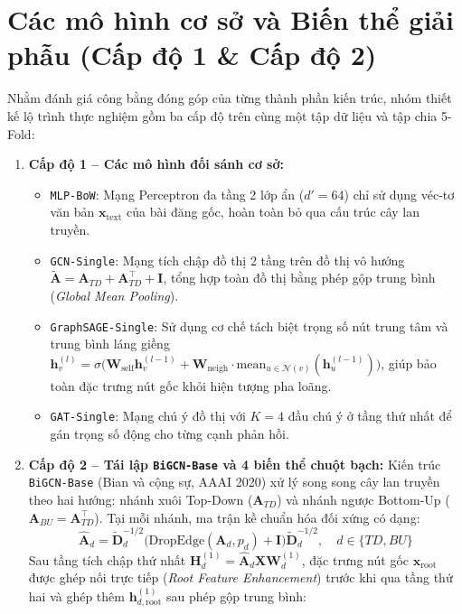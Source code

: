 \documentclass[11pt,a4paper]{extreport}
\begin{document}
\section{Các mô hình cơ sở và Biến thể giải phẫu (Cấp độ 1 \& Cấp độ 2)}

Nhằm đánh giá công bằng đóng góp của từng thành phần kiến trúc, nhóm thiết kế lộ trình thực nghiệm gồm ba cấp độ trên cùng một tập dữ liệu và tập chia 5-Fold:

\begin{enumerate}
    \item \textbf{Cấp độ 1 -- Các mô hình đối sánh cơ sở:}
    \begin{itemize}
        \item \texttt{MLP-BoW}: Mạng Perceptron đa tầng 2 lớp ẩn ($d'=64$) chỉ sử dụng véc-tơ văn bản $\mathbf{x}_{\text{text}}$ của bài đăng gốc, hoàn toàn bỏ qua cấu trúc cây lan truyền.
        \item \texttt{GCN-Single}: Mạng tích chập đồ thị 2 tầng trên đồ thị vô hướng $\tilde{\mathbf{A}} = \mathbf{A}_{TD} + \mathbf{A}_{TD}^\top + \mathbf{I}$, tổng hợp toàn đồ thị bằng phép gộp trung bình (\textit{Global Mean Pooling}).
        \item \texttt{GraphSAGE-Single}: Sử dụng cơ chế tách biệt trọng số nút trung tâm và trung bình láng giềng $\mathbf{h}_v^{(l)} = \sigma\big(\mathbf{W}_{\text{self}}\mathbf{h}_v^{(l-1)} + \mathbf{W}_{\text{neigh}}\cdot\text{mean}_{u\in\mathcal{N}(v)}(\mathbf{h}_u^{(l-1)})\big)$, giúp bảo toàn đặc trưng nút gốc khỏi hiện tượng pha loãng.
        \item \texttt{GAT-Single}: Mạng chú ý đồ thị với $K=4$ đầu chú ý ở tầng thứ nhất để gán trọng số động cho từng cạnh phản hồi.
    \end{itemize}
    \item \textbf{Cấp độ 2 -- Tái lập \texttt{BiGCN-Base} và 4 biến thể chuột bạch:}
    Kiến trúc \texttt{BiGCN-Base} (Bian và cộng sự, AAAI 2020) xử lý song song cây lan truyền theo hai hướng: nhánh xuôi Top-Down ($\mathbf{A}_{TD}$) và nhánh ngược Bottom-Up ($\mathbf{A}_{BU} = \mathbf{A}_{TD}^\top$). Tại mỗi nhánh, ma trận kề chuẩn hóa đối xứng có dạng:
    \begin{equation}
        \hat{\mathbf{A}}_d = \tilde{\mathbf{D}}_d^{-1/2}\big(\text{DropEdge}(\mathbf{A}_d, p_d) + \mathbf{I}\big)\tilde{\mathbf{D}}_d^{-1/2}, \quad d \in \{TD, BU\}
        \label{eq:bigcn-adj}
    \end{equation}
    Sau tầng tích chập thứ nhất $\mathbf{H}_d^{(1)} = \hat{\mathbf{A}}_d\mathbf{X}\mathbf{W}_d^{(1)}$, đặc trưng nút gốc $\mathbf{x}_{\text{root}}$ được ghép nối trực tiếp (\textit{Root Feature Enhancement}) trước khi qua tầng thứ hai và ghép thêm $\mathbf{h}_{d,\text{root}}^{(1)}$ sau phép gộp trung bình:

\end{enumerate}
\end{document}
